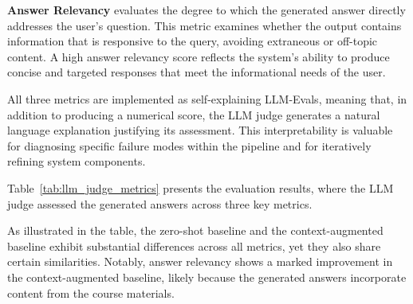 \textbf{Answer Relevancy} evaluates the degree to which the generated answer directly addresses the user's question. This metric examines whether the output contains information that is responsive to the query, avoiding extraneous or off-topic content. A high answer relevancy score reflects the system's ability to produce concise and targeted responses that meet the informational needs of the user.

All three metrics are implemented as self-explaining LLM-Evals, meaning that, in addition to producing a numerical score, the LLM judge generates a natural language explanation justifying its assessment. This interpretability is valuable for diagnosing specific failure modes within the pipeline and for iteratively refining system components.

Table~\ref{tab:llm_judge_metrics} presents the evaluation results, where the LLM judge assessed the generated answers across three key metrics.

\begin{table}[ht]
    \centering
    \caption{LLM-as-judge scores. Higher
        scores are better.}
    \label{tab:llm_judge_metrics}
\end{table}

As illustrated in the table, the zero-shot baseline and the context-augmented baseline exhibit substantial differences across all metrics, yet they also share certain similarities. Notably, answer relevancy shows a marked improvement in the context-augmented baseline, likely because the generated answers incorporate content from the course materials.

